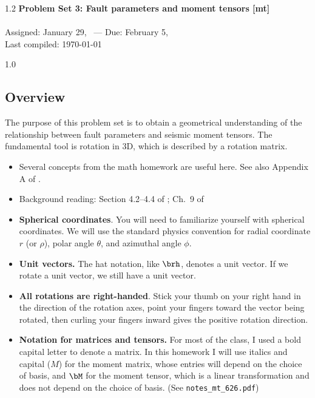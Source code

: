 \documentclass[11pt,titlepage,fleqn]{article}
\begin{document}

\begin{spacing}{1.2}
\centering
{\large \bf Problem Set 3: Fault parameters and moment tensors [mt]} \\
\cltag\ \\
Assigned: January 29, \cyear\ --- Due: February 5, \cyear\ \\
Last compiled: \today
\end{spacing}

\begin{spacing}{1.0}

\subsection*{Overview}

The purpose of this problem set is to obtain a geometrical understanding of the relationship between fault parameters and seismic moment tensors. The fundamental tool is rotation in 3D, which is described by a rotation matrix.

\begin{itemize}
\item Several concepts from the math homework are useful here. See also Appendix A of \citet{SteinWysession}.

\item Background reading: Section 4.2--4.4 of \citet{SteinWysession}; Ch.~9 of \citet{ShearerE2}

\item {\bf Spherical coordinates}. You will need to familiarize yourself with spherical coordinates. We will use the standard physics convention for radial coordinate $r$ (or $\rho$), polar angle $\theta$, and azimuthal angle $\phi$.

\item {\bf Unit vectors.} The hat notation, like $\brh$, denotes a unit vector. If we rotate a unit vector, we still have a unit vector.

\item {\bf All rotations are right-handed}. Stick your thumb on your right hand in the direction of the rotation axes, point your fingers toward the vector being rotated, then curling your fingers inward gives the positive rotation direction.

\item {\bf Notation for matrices and tensors.} For most of the class, I used a bold capital letter to denote a matrix. In this homework I will use italics and capital ($M$) for the moment matrix, whose entries will depend on the choice of basis, and $\bM$ for the moment tensor, which is a linear transformation and does not depend on the choice of basis. (See \verb+notes_mt_626.pdf+)


\end{itemize}
\end{spacing}
\end{document}
